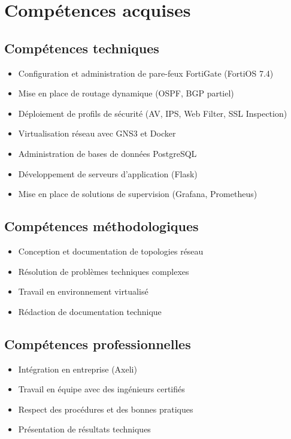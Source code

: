 \section{Compétences acquises}

\subsection{Compétences techniques}

\begin{itemize}
    \item Configuration et administration de pare-feux FortiGate (FortiOS 7.4)
    \item Mise en place de routage dynamique (OSPF, BGP partiel)
    \item Déploiement de profils de sécurité (AV, IPS, Web Filter, SSL Inspection)
    \item Virtualisation réseau avec GNS3 et Docker
    \item Administration de bases de données PostgreSQL
    \item Développement de serveurs d'application (Flask)
    \item Mise en place de solutions de supervision (Grafana, Prometheus)
\end{itemize}

\subsection{Compétences méthodologiques}

\begin{itemize}
    \item Conception et documentation de topologies réseau
    \item Résolution de problèmes techniques complexes
    \item Travail en environnement virtualisé
    \item Rédaction de documentation technique
\end{itemize}

\subsection{Compétences professionnelles}

\begin{itemize}
    \item Intégration en entreprise (Axeli)
    \item Travail en équipe avec des ingénieurs certifiés
    \item Respect des procédures et des bonnes pratiques
    \item Présentation de résultats techniques
\end{itemize}

